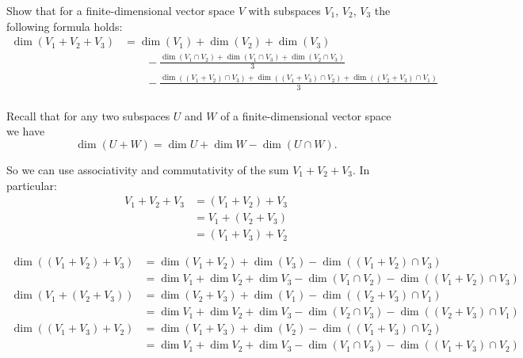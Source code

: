 \begin{xrcs}
  Show that for a finite-dimensional vector space $V$ with subspaces $V_1$, $V_2$, $V_3$ the following formula holds:
  \begin{equation}
    \begin{aligned}
      \dim (V_1 + V_2 + V_3)  &= \dim (V_1) + \dim (V_2) + \dim (V_3) \\
      & \qquad - \frac{\dim (V_1 \cap V_2) + \dim (V_1 \cap V_3) + \dim (V_2 \cap V_3)}{3} \\
      & \qquad - \frac{ \dim \left(  (V_1 + V_2) \cap V_3 \right) + \dim \left( (V_1 + V_3) \cap V_2 \right)+ \dim \left( (V_2 + V_3) \cap V_1 \right) }{3} \\
    \end{aligned}
  \end{equation}

   Recall that for any two subspaces $U$ and $W$ of a finite-dimensional vector space we have
  \begin{equation}
    \dim (U + W)  = \dim U + \dim W - \dim (U \cap W).
  \end{equation}

  So we can use associativity and commutativity of the sum $V_1 + V_2 + V_3$. In particular:
  \begin{equation}
    \begin{aligned}
      V_1 + V_2 + V_3 & = (V_1 + V_2) + V_3 \\
                      & = V_1 + (V_2 + V_3) \\
                      & = (V_1 + V_3) + V_2
    \end{aligned}
  \end{equation}

  \begin{equation}
    \begin{aligned}
      \dim((V_1 + V_2) + V_3)
      & = \dim(V_1 + V_2) + \dim(V_3) - \dim ((V_1 + V_2) \cap V_3) \\
      & = \dim V_1 + \dim V_2 + \dim V_3 - \dim(V_1 \cap V_2) - \dim ((V_1 + V_2) \cap V_3) \\
      \dim(V_1 + (V_2 + V_3))
      & = \dim(V_2 + V_3) + \dim(V_1) - \dim ((V_2 + V_3) \cap V_1) \\
      & = \dim V_1 + \dim V_2 + \dim V_3 - \dim(V_2 \cap V_3) - \dim ((V_2 + V_3) \cap V_1) \\
      \dim((V_1 + V_3) + V_2)
      & = \dim(V_1 + V_3) + \dim(V_2) - \dim ((V_1 + V_3) \cap V_2) \\
      & = \dim V_1 + \dim V_2 + \dim V_3 - \dim(V_1 \cap V_3) - \dim ((V_1 + V_3) \cap V_2) \\
    \end{aligned}
  \end{equation}


\end{xrcs}
